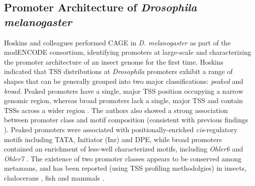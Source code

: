 \documentclass[runningheads,a4paper]{llncs}
\begin{document}
\begin{linenumbers}
\subsection{Promoter Architecture of \textit{Drosophila melanogaster}}
Hoskins and colleagues \cite{Hoskins:2011io} performed CAGE in \textit{D. melanogaster} as part of the modENCODE consortium, identifying promoters at large-scale and characterizing the promoter architecture of an insect genome for the first time.
Hoskins \cite{Hoskins:2011io} indicated that TSS distributions at \textit{Drosophila} promoters exhibit a range of shapes that can be generally grouped into two major classifications: \textit{peaked} and \textit{broad}. 
Peaked promoters have a single, major TSS position occupying a narrow genomic region, whereas broad promoters lack a single, major TSS and contain TSSs across a wider region \cite{Rach:2009ct}\cite{Lenhard:2012en}. 
The authors also showed a strong association between promoter class and motif composition (consistent with previous findings \cite{Rach:2009ct,Ni:2010jh}). 
Peaked promoters were associated with positionally-enriched \textit{cis}-regulatory motifs including TATA, Initiator (Inr) and DPE, while broad promoters contained an enrichment of less-well characterized motifs, including \textit{Ohler6} and \textit{Ohler7} \cite{Ohler:2002vl}. 
The existence of two promoter classes appears to be conserved among metazoans, and has been reported (using TSS profiling methodolgies) in insects, cladocerans \cite{Raborn:2016cr}, fish \cite{Nepal:2013bga} and mammals \cite{Carninci:2006in,Lenhard:2012en}.


\end{linenumbers}
\end{document}
